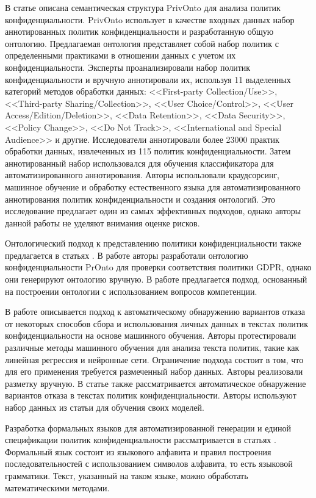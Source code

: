 \documentclass[../main]{subfiles}
\begin{document}
В статье \cite{MDPI6} описана семантическая структура PrivOnto для анализа политик конфиденциальности. PrivOnto использует в качестве входных данных набор аннотированных политик конфиденциальности и разработанную общую онтологию. Предлагаемая онтология представляет собой набор политик с определенными практиками в отношении данных с учетом их конфиденциальности. Эксперты проанализировали набор политик конфиденциальности и вручную аннотировали их, используя 11 выделенных категорий методов обработки данных: <<First-party Collection/Use>>, <<Third-party Sharing/Col\-lection>>, <<User Choice/Control>>, <<User Access/Edition/Deletion>>, <<Data Retention>>, <<Data Security>>, <<Policy Change>>, <<Do Not Track>>, <<International and Special Audience>> и другие. Исследователи аннотировали более 23000 практик обработки данных, извлеченных из 115 политик конфиденциальности. Затем аннотированный набор использовался для обучения классификатора для автоматизированного аннотирования. Авторы использовали краудсорсинг, машинное обучение и обработку естественного языка для автоматизированного аннотирования политик конфиденциальности и создания онтологий. Это исследование предлагает один из самых эффективных подходов, однако авторы данной работы не уделяют внимания оценке рисков.

Онтологический подход к представлению политики конфиденциальности также предлагается в статьях \cite{MDPI7, MDPI8}. В работе \cite{MDPI7} авторы разработали онтологию конфиденциальности PrOnto для проверки соответствия политики GDPR, однако они генерируют онтологию вручную. В работе \cite{MDPI8} предлагается подход, основанный на построении онтологии с использованием вопросов компетенции.

В работе \cite{MDPI9} описывается подход к автоматическому обнаружению вариантов отказа от некоторых способов сбора и использования личных данных в текстах политик конфиденциальности на основе машинного обучения. Авторы \cite{MDPI9} протестировали различные методы машинного обучения для анализа текста политик, такие как линейная регрессия и нейронные сети. Ограничение подхода состоит в том, что для его применения требуется размеченный набор данных. Авторы реализовали разметку вручную. В статье \cite{MDPI10} также рассматривается автоматическое обнаружение вариантов отказа в текстах политик конфиденциальности. Авторы используют набор данных из статьи \cite{MDPI6} для обучения своих моделей.

Разработка формальных языков для автоматизированной генерации и единой спецификации политик конфиденциальности рассматривается в статьях \cite{MDPI11,MDPI12,MDPI13,MDPI14,MDPI15}. Формальный язык состоит из языкового алфавита и правил построения последовательностей с использованием символов алфавита, то есть языковой грамматики. Текст, указанный на таком языке, можно обработать математическими методами.
\end{document}
